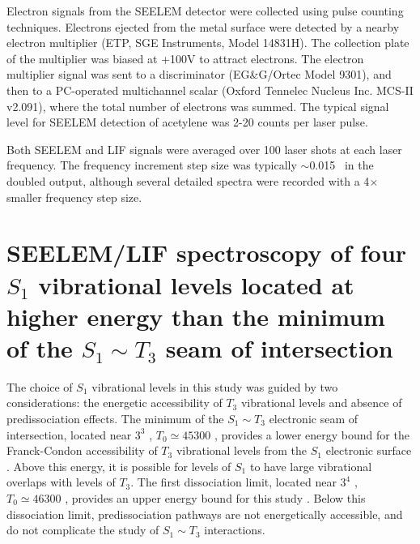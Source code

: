 Electron signals from the SEELEM detector were collected using pulse
counting techniques.  Electrons ejected from the metal surface were
detected by a nearby electron multiplier (ETP, SGE Instruments, Model
14831H).  The collection plate of the multiplier was biased at +100V
to attract electrons.  The electron multiplier signal was sent to a
discriminator (EG\&G/Ortec Model 9301), and then to a PC-operated
multichannel scalar (Oxford Tennelec Nucleus Inc. MCS-II v2.091),
where the total number of electrons was summed.  The typical signal
level for SEELEM detection of acetylene was 2-20 counts per laser
pulse.

Both SEELEM and LIF signals were averaged over 100 laser shots at each
laser frequency.  The frequency increment step size was typically
$\sim$0.015 \rcm\ in the doubled output, although several detailed
spectra were recorded with a 4$\times$ smaller frequency step size.





























\section{SEELEM/LIF spectroscopy of four $S_1$ vibrational levels
  located at higher energy than the minimum of the $S_1 \sim T_3$ seam
  of intersection}


The choice of $S_1$ vibrational levels in this study was guided by two
considerations: the energetic accessibility of $T_3$ vibrational
levels \cite{cui97, thom07} and absence of predissociation effects.
The minimum of the $S_1 \sim T_3$ electronic seam of intersection,
located near $3^3$ , $T_0 \simeq 45300$ \rcm, provides a lower
energy bound for the Franck-Condon accessibility of $T_3$ vibrational
levels from the $S_1$ electronic surface \cite{cui97}.  Above this
energy, it is possible for levels of $S_1$ to have large vibrational
overlaps with levels of $T_3$.  The first dissociation limit, located
near $3^4$ , $T_0 \simeq 46300$ \rcm, provides an upper energy
bound for this study \cite{mordaunt98}.  Below this dissociation
limit, predissociation pathways are not energetically accessible, and
do not complicate the study of $S_1 \sim T_3$ interactions.

